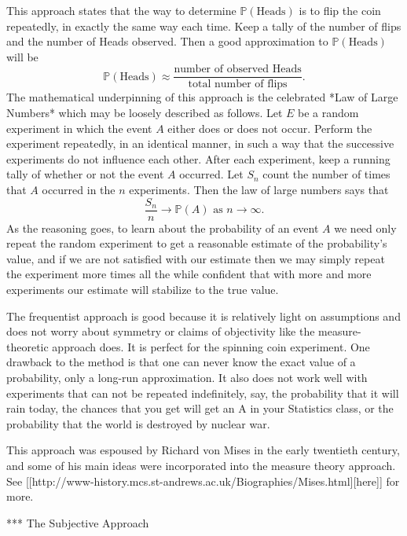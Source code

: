 This approach states that the way to determine
\(\mathbb{P}(\mbox{Heads})\) is to flip the coin repeatedly, in
exactly the same way each time. Keep a tally of the number of flips
and the number of Heads observed. Then a good approximation to
\(\mathbb{P}(\mbox{Heads})\) will be
\begin{equation} 
\mathbb{P}(\mbox{Heads})\approx\frac{\mbox{number of observed Heads}}{\mbox{total number of flips}}.
\end{equation}
The mathematical underpinning of this approach is the celebrated *Law
of Large Numbers* which may be loosely described as follows. Let \(E\)
be a random experiment in which the event \(A\) either does or does
not occur. Perform the experiment repeatedly, in an identical manner,
in such a way that the successive experiments do not influence each
other. After each experiment, keep a running tally of whether or not
the event \(A\) occurred. Let \(S_{n}\) count the number of times that
\(A\) occurred in the \(n\) experiments. Then the law of large numbers
says that
\begin{equation}
\frac{S_{n}}{n}\to\mathbb{P}(A)\mbox{ as }n\to\infty.
\end{equation}
As the reasoning goes, to learn about the probability of an event
\(A\) we need only repeat the random experiment to get a reasonable
estimate of the probability's value, and if we are not satisfied with
our estimate then we may simply repeat the experiment more times all
the while confident that with more and more experiments our estimate
will stabilize to the true value.

The frequentist approach is good because it is relatively light on
assumptions and does not worry about symmetry or claims of objectivity
like the measure-theoretic approach does. It is perfect for the
spinning coin experiment. One drawback to the method is that one can
never know the exact value of a probability, only a long-run
approximation. It also does not work well with experiments that can
not be repeated indefinitely, say, the probability that it will rain
today, the chances that you get will get an A in your Statistics
class, or the probability that the world is destroyed by nuclear war.

This approach was espoused by Richard von Mises in the early twentieth
century, and some of his main ideas were incorporated into the measure
theory approach. See [[http://www-history.mcs.st-andrews.ac.uk/Biographies/Mises.html][here]] for more.

*** The Subjective Approach

